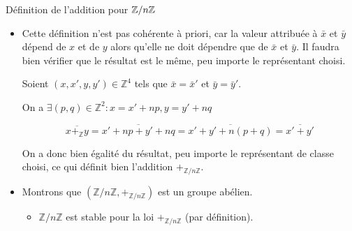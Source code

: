 \documentclass{article}
\renewenvironment{question_kholle}[2][ ]
{
	\subsection{\texorpdfstring{#2}{}}
	\notblank{#1}
	{
		\noindent #1
		\bigbreak
	}
	{}
	\begin{proof}
}
{
	\end{proof}
}
\begin{document}
\begin{question_kholle}{Définition de l'addition pour $\mathbb Z / n \mathbb Z$}
  
  \begin{itemize}[label=$\star$]
    \item Cette définition n'est pas cohérente à priori, car la valeur attribuée à $\bar x$ et $\bar y$ dépend de $x$ et de $y$ alors qu'elle ne doit dépendre que de $\bar x$ et $\bar y$. Il faudra bien vérifier que le résultat est le même, peu importe le représentant choisi.
    
    Soient $(x, x', y, y') \in \mathbb{Z}^{4}$ tels que $\bar{x} = \bar{x}'$ et $\bar{y} = \bar{y}'$.
    
    On a $\exists (p, q) \in \mathbb{Z}^{2} : x = x' + np, y=y'+nq$
    
$$
    \overline{x+_{\mathbb{Z}}y} = \overline{x'+np + y' + nq} = \overline{x'+y' + n(p+q)} = \overline{x'+y'}
$$
    
    On a donc bien égalité du résultat, peu importe le représentant de classe choisi, ce qui définit bien l'addition $+_{\mathbb{Z}/n\mathbb{Z}}$.
    
    \item Montrons que $(\mathbb{Z}/n\mathbb{Z}, +_{\mathbb{Z}/n\mathbb{Z}})$ est un groupe abélien.
    \begin{itemize}[label=$\bullet$]
      \item $\mathbb{Z}/n\mathbb{Z}$ est stable pour la loi $+_{\mathbb{Z}/n\mathbb{Z}}$ (par définition).
      

\end{itemize}
\end{itemize}
\end{question_kholle}
\end{document}
